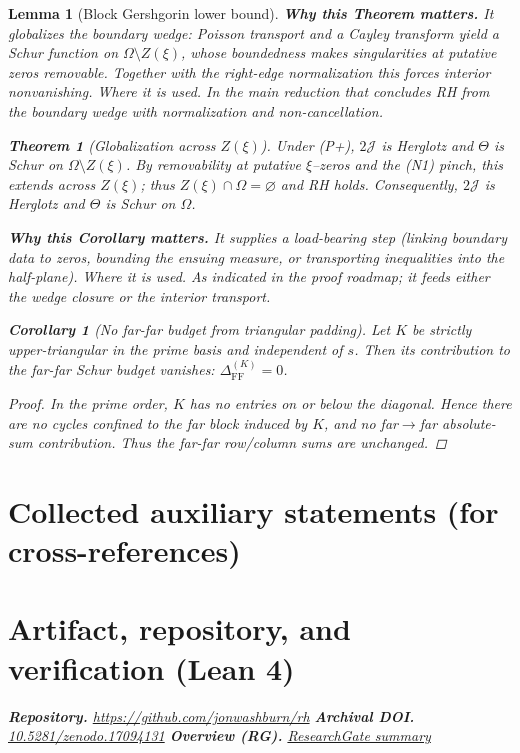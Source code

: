 \documentclass[11pt]{article}
\newtheorem{theorem}{Theorem}[section]
\newtheorem{lemma}{Lemma}[section]
\newtheorem{corollary}{Corollary}[section]
\theoremstyle{definition}
\theoremstyle{remark}
\begin{document}
\begin{lemma}[Block Gershgorin lower bound]
\vspace{1.0cm}
\noindent\textbf{Why this Theorem matters.} It globalizes the boundary wedge: Poisson transport and a Cayley transform yield a Schur function on $\Omega\setminus Z(\xi)$, whose boundedness makes singularities at putative zeros removable. Together with the right-edge normalization this forces interior nonvanishing.
\noindent\textit{Where it is used.} In the main reduction that concludes RH from the boundary wedge with normalization and non-cancellation.
\begin{theorem}[Globalization across $Z(\xi)$]\label{thm:globalize-main}
Under (P+), $2\mathcal J$ is Herglotz and $\Theta$ is Schur on $\Omega\setminus Z(\xi)$. By removability at putative $\xi$--zeros and the (N1) pinch, this extends across $Z(\xi)$; thus $Z(\xi)\cap\Omega=\varnothing$ and RH holds. Consequently, $2\mathcal J$ is Herglotz and $\Theta$ is Schur on $\Omega$.
\end{theorem}





\vspace{1.0cm}
\noindent\textbf{Why this Corollary matters.} It supplies a load-bearing step (linking boundary data to zeros, bounding the ensuing measure, or transporting inequalities into the half-plane).
\noindent\textit{Where it is used.} As indicated in the proof roadmap; it feeds either the wedge closure or the interior transport.
\begin{corollary}[No far-far budget from triangular padding]\label{cor:K-no-FF}
Let $K$ be strictly upper-triangular in the prime basis and independent of $s$. Then its contribution to the far-far Schur budget vanishes: $\Delta_{\mathrm{FF}}^{(K)}=0$.
\end{corollary}
\begin{proof}
In the prime order, $K$ has no entries on or below the diagonal. Hence there are no cycles confined to the far block induced by $K$, and no far$\to$far absolute-sum contribution. Thus the far-far row/column sums are unchanged.
\end{proof}
% 
\section*{Collected auxiliary statements (for cross-references)}
\section*{Artifact, repository, and verification (Lean 4)}
\vspace{-0.3em}
\noindent\textbf{Repository.} \url{https://github.com/jonwashburn/rh} \quad
\textbf{Archival DOI.} \href{https://doi.org/10.5281/zenodo.17094131}{10.5281/zenodo.17094131} \quad
\textbf{Overview (RG).} \href{https://www.researchgate.net/publication/395024442_A_Function-Theoretic_Route_to_the_Riemann_Hypothesis}{ResearchGate summary}


\end{lemma}
\end{document}
